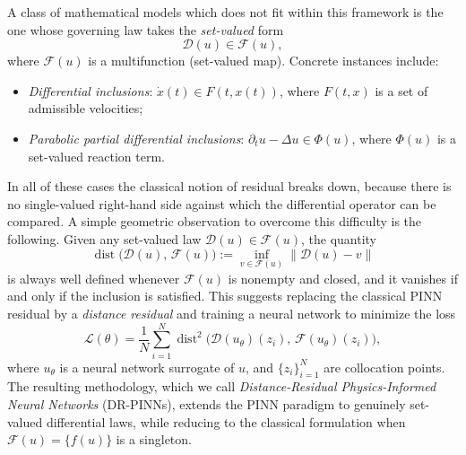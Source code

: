 \documentclass[11pt]{elsarticle}
\theoremstyle{definition}
\theoremstyle{remark}
\numberwithin{equation}{section}
\def\dist{\operatorname{dist}}
\begin{document}
	A class of mathematical models which does not fit within this
	framework is the one whose governing law takes the \emph{set-valued} form
	\[
	\mathcal{D}(u) \in \mathcal{F}(u),
	\]
	where $\mathcal{F}(u)$ is a multifunction (set-valued map).  Concrete
	instances include:
	\begin{itemize}
		\item \emph{Differential inclusions}: $\dot{x}(t)\in F(t,x(t))$,
		where $F(t,x)$ is a set of admissible velocities;
		\item \emph{Parabolic partial differential inclusions}:
		$\partial_t u - \Delta u \in \Phi(u)$, where $\Phi(u)$ is a
		set-valued reaction term.
	\end{itemize}
	In all of these cases the classical notion of residual breaks down,
	because there is no single-valued right-hand side against which the
	differential operator can be compared. 	
	A simple geometric observation to overcome this difficulty is the following.  Given any
	set-valued law $\mathcal{D}(u)\in\mathcal{F}(u)$, the quantity
	\[
	\dist\bigl(\mathcal{D}(u),\,\mathcal{F}(u)\bigr)
	:= \inf_{v\in \mathcal{F}(u)} \|\mathcal{D}(u) - v \|
	\]
	is always well defined whenever $\mathcal{F}(u)$ is nonempty and
	closed, and it vanishes if and only if the inclusion is satisfied.  This
	suggests replacing the classical PINN residual by a \emph{distance
		residual} and training a neural network to minimize the loss
	\[
	\mathcal{L}(\theta)
	=
	\frac{1}{N}\sum_{i=1}^{N}
	\dist^2\bigl(\mathcal{D}(u_\theta)(z_i),\,
	\mathcal{F}(u_\theta)(z_i)\bigr),
	\]
	where $u_\theta$ is a neural network surrogate of $u$, and $\{z_i\}_{i=1}^N$ are collocation points.  The resulting methodology, which
	we call \emph{Distance-Residual Physics-Informed Neural Networks}
	(DR-PINNs), extends the PINN paradigm to genuinely set-valued
	differential laws, while reducing to the classical formulation when
	$\mathcal{F}(u)=\{f(u)\}$ is a singleton.
	
	\vspace{0.3cm}
	
\end{document}
